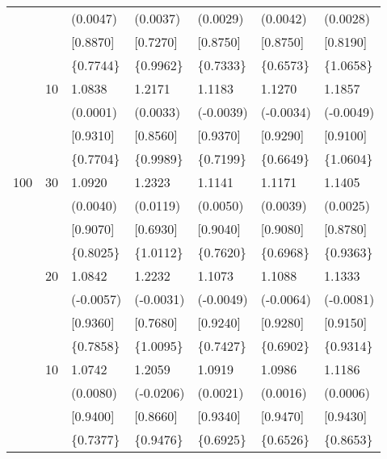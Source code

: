 \begin{table}[H]
{\begin{tabular}{c c | C{2.48cm} | C{2.48cm} | C{2.48cm} | C{2.48cm} | C{2.48cm} }
			&&(0.0047)&(0.0037)&(0.0029)&(0.0042)&(0.0028)\\
			&&[0.8870]&[0.7270]&[0.8750]&[0.8750]&[0.8190]\\
			&&\{0.7744\}&\{0.9962\}&\{0.7333\}&\{0.6573\}&\{1.0658\}\\
			&10&1.0838&1.2171&1.1183&1.1270&1.1857\\
			&&(0.0001)&(0.0033)&(-0.0039)&(-0.0034)&(-0.0049)\\
			&&[0.9310]&[0.8560]&[0.9370]&[0.9290]&[0.9100]\\
			&&\{0.7704\}&\{0.9989\}&\{0.7199\}&\{0.6649\}&\{1.0604\}\\
			\cmidrule(lr){1-7}
			100&30&1.0920&1.2323&1.1141&1.1171&1.1405\\
			&&(0.0040)&(0.0119)&(0.0050)&(0.0039)&(0.0025)\\
			&&[0.9070]&[0.6930]&[0.9040]&[0.9080]&[0.8780]\\
			&&\{0.8025\}&\{1.0112\}&\{0.7620\}&\{0.6968\}&\{0.9363\}\\
			&20&1.0842&1.2232&1.1073&1.1088&1.1333\\
			&&(-0.0057)&(-0.0031)&(-0.0049)&(-0.0064)&(-0.0081)\\
			&&[0.9360]&[0.7680]&[0.9240]&[0.9280]&[0.9150]\\
			&&\{0.7858\}&\{1.0095\}&\{0.7427\}&\{0.6902\}&\{0.9314\}\\
			&10&1.0742&1.2059&1.0919&1.0986&1.1186\\
			&&(0.0080)&(-0.0206)&(0.0021)&(0.0016)&(0.0006)\\
			&&[0.9400]&[0.8660]&[0.9340]&[0.9470]&[0.9430]\\
			&&\{0.7377\}&\{0.9476\}&\{0.6925\}&\{0.6526\}&\{0.8653\}\\
			\bottomrule[1.5pt]
	\end{tabular}}
	\label{table:table S.2}
\end{table}

